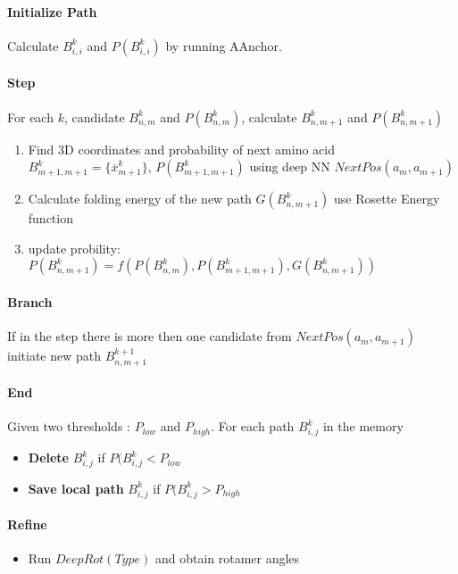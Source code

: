 \documentclass{article}
\begin{document}
\paragraph{Initialize Path}
Calculate $B^k_{i,i}$ and $P(B^k_{i,i})$ by running AAnchor. 

\paragraph{Step}
For each $k$, candidate $B^k_{n,m}$ and $P(B^k_{n,m})$, calculate $B^k_{n,m+1}$ and $P(B^k_{n,m+1})$
\begin{enumerate}
    \item Find 3D coordinates and probability   of next  amino acid $B^k_{m+1,m+1} = \{\overline{x}^k_{m+1}\}$, $P(B^k_{m+1,m+1})$ using deep NN $NextPos(a_m,a_{m+1})$ 
    \item Calculate folding energy of the new path $G(B^k_{n,m+1})$ use Rosette Energy function
    \item update probility:
    $P(B^k_{n,m+1}) = f \left(P(B^k_{n,m}),P(B^k_{m+1,m+1}),G(B^k_{n,m+1}) \right)$
\end{enumerate}

\paragraph{Branch}
If in the step there is more then one candidate from $NextPos(a_m,a_{m+1})$ initiate new path $B^{k+1}_{n,m+1}$


\paragraph{End}
Given two thresholds : $P_{low}$ and $P_{high}$.
For each path $B^k_{i,j} $ in the memory
\begin{itemize}
    \item \textbf{Delete} $B^k_{i,j}$ if $P(B^k_{i,j} < P_{low}$ 
    \item \textbf{Save local path } $B^k_{i,j}$ if $P(B^k_{i,j} > P_{high}$ 
\end{itemize}

\paragraph{Refine}
\begin{itemize}
	\item Run $DeepRot(Type)$ and obtain rotamer angles
\end{itemize}
\end{document}
